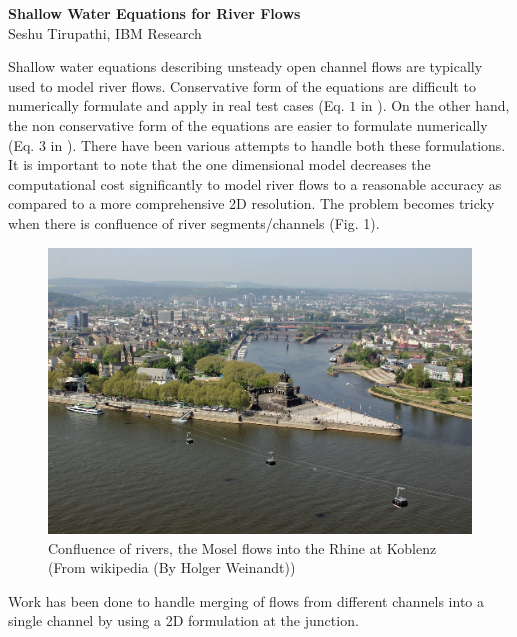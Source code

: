 \documentclass[a4paper, 11pt]{article}
\begin{document}
\begin{center}
  {\Large \textbf{Shallow Water Equations for River Flows}}\\
   Seshu Tirupathi, IBM Research
\end{center}

Shallow water equations describing unsteady open channel flows are
typically used to model river flows. Conservative form of the
equations are difficult to numerically formulate and apply in real
test cases (Eq. $1$ in  \cite{garcia2008shallow}). On the other hand, the non conservative form of the equations are easier to formulate numerically (Eq. $3$ in \cite{garcia2008shallow}). There have been various attempts to handle both these formulations. It is important to note that the one dimensional model decreases the computational cost significantly to model river flows to a reasonable accuracy as compared to a more comprehensive 2D resolution. The problem becomes tricky when there is confluence of river segments/channels (Fig. 1). 
\begin{figure}[htb]
\centering
\includegraphics[width=0.6\linewidth]{./confluence}
\caption{Confluence of rivers, the Mosel flows into the Rhine at Koblenz (From wikipedia (By Holger Weinandt)) }
\end{figure}
Work has been done to handle merging of flows from different channels into a single channel by using a 2D formulation at the junction. 
\end{document}
